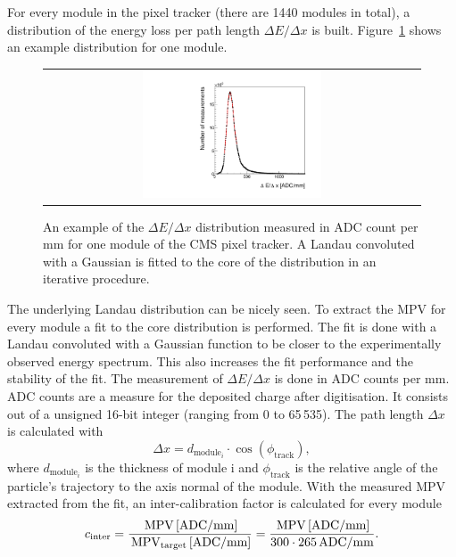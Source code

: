 For every module in the pixel tracker (there are 1440 modules in total), a distribution of the energy loss per path length $\Delta E/\Delta x$ is built.
Figure~\ref{fig:dEdx_Module} shows an example distribution for one module.
\begin{figure}[!bt]
  \centering 
  \begin{tabular}{c}
  \includegraphics[width=0.49\textwidth]{figures/analysis/Landau_Module_352476680.pdf}
  \end{tabular}
  \caption{An example of the $\Delta E/\Delta x$ distribution measured in ADC count per mm for one module of the CMS pixel tracker. 
           A Landau convoluted with a Gaussian is fitted to the core of the distribution in an iterative procedure.} 
  \label{fig:dEdx_Module}
\end{figure}
The underlying Landau distribution can be nicely seen. 
To extract the MPV for every module a fit to the core distribution is performed.
The fit is done with a Landau convoluted with a Gaussian function to be closer to the experimentally observed energy spectrum.
This also increases the fit performance and the stability of the fit.
The measurement of $\Delta E/\Delta x$ is done in ADC counts per mm.
ADC counts are a measure for the deposited charge after digitisation.
It consists out of a unsigned 16-bit integer (ranging from 0 to 65\,535).
The path length $\Delta x$ is calculated with
\begin{equation*}
\Delta x = d_{\text{module}_i} \cdot \cos(\phi_{\text{track}}),
\end{equation*}
where $d_{\text{module}_i}$ is the thickness of module i and $\phi_{\text{track}}$ is the relative angle of the particle's trajectory to the axis normal of the module.
With the measured MPV extracted from the fit, an inter-calibration factor is calculated for every module
\begin{equation*}
c_{\text{inter}}=\frac{\,\text{MPV}\, [\text{ADC/mm}]}{\,\text{MPV}_{\text{target}}\, [\text{ADC/mm}]} = \frac{\,\text{MPV}\, [\text{ADC/mm}]}{300 \cdot 265 \, \text{ADC/mm}}.
\end{equation*}
